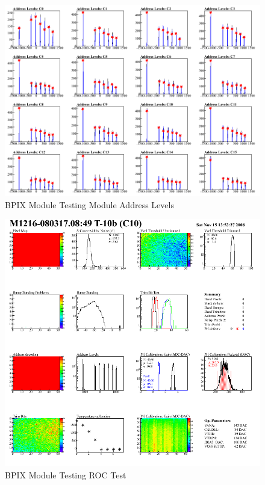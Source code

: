 \documentclass[0_Bericht]{subfiles}
\begin{document}
					\begin{figure}[h!]
						\centering
						\includegraphics[width=160mm]{Content/Graphics/4_3_AddressLevels.png}
						\caption{BPIX Module Testing Module Address Levels}
						\label{fig:AnalysisOfExistingApplicationBPIXModuleTestingAddressLevels}
					\end{figure}
					\begin{figure}[h!]
						\centering
						\includegraphics[width=160mm]{Content/Graphics/4_4_ROCTest.png}
						\caption{BPIX Module Testing ROC Test}
						\label{fig:AnalysisOfExistingApplicationBPIXModuleTestingROCTest}
					\end{figure}
					
\end{document}
